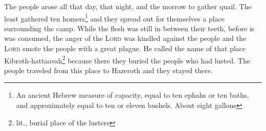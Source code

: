 \begin{enumerate*}[mode=unboxed]
     The people arose all that day, that night, and the morrow to gather quail. The least gathered ten homers\footnote{An ancient Hebrew measure of capacity, equal to ten ephahs or ten baths, and approximately equal to ten or eleven bushels. About eight gallons} and they spread out for themselves a place surrounding the camp.%
     While the flesh was still in between their teeth, before is was consumed, the anger of the \textsc{Lord} was kindled against the people and the \textsc{Lord} smote the people with a great plague.%
     He called the name of that place Kibroth-hattaavah\footnote{lit., burial place of the lusters} because there they buried the people who had lusted.%
     The people traveled from this place to Hazeroth and they stayed there.%
\end{enumerate*}
